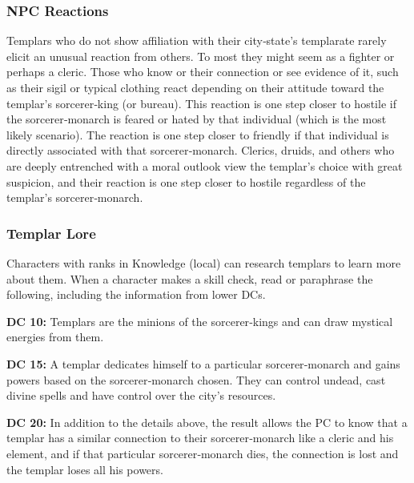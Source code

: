 \subsubsection{NPC Reactions}
Templars who do not show affiliation with their city‐state's templarate rarely elicit an unusual reaction from others. To most they might seem as a fighter or perhaps a cleric. Those who know or their connection or see evidence of it, such as their sigil or typical clothing react depending on their attitude toward the templar's sorcerer‐king (or bureau). This reaction is one step closer to hostile if the sorcerer‐monarch is feared or hated by that individual (which is the most likely scenario). The reaction is one step closer to friendly if that individual is directly associated with that sorcerer‐monarch. Clerics, druids, and others who are deeply entrenched with a moral outlook view the templar's choice with great suspicion, and their reaction is one step closer to hostile regardless of the templar's sorcerer‐monarch.

\subsubsection{Templar Lore}
Characters with ranks in Knowledge (local) can research templars to learn more about them. When a character makes a skill check, read or paraphrase the following, including the information from lower DCs.

\textbf{DC 10:} Templars are the minions of the sorcerer‐kings and can draw mystical energies from them.

\textbf{DC 15:} A templar dedicates himself to a particular sorcerer‐monarch and gains powers based on the sorcerer‐monarch chosen. They can control undead, cast divine spells and have control over the city's resources.

\textbf{DC 20:} In addition to the details above, the result allows the PC to know that a templar has a similar connection to their sorcerer‐monarch like a cleric and his element, and if that particular sorcerer‐monarch dies, the connection is lost and the templar loses all his powers.